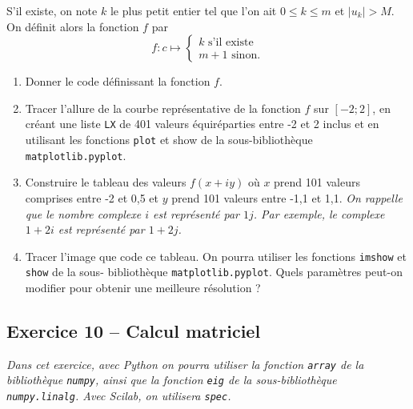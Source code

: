 \documentclass[10pt,fleqn]{article} %
\begin{document}
\begin{multicols}{2}
S’il existe, on note $k$ le plus petit entier tel que l’on ait $0 \leq k \leq m$ et $|u_k| > M$.
On définit alors la fonction $f$ par 
$$
f : c \mapsto 
\left\{
\begin{array}{l}
k \text{ s'il existe} \\
m+1  \text{ sinon.}
\end{array}
\right.
$$

\begin{enumerate}
\item  Donner le code définissant la fonction $f$.
\item  Tracer l’allure de la courbe représentative de la fonction $f$ sur $[-2; 2]$, en créant une liste \texttt{LX} de 401 valeurs équiréparties entre -2 et 2 inclus et en utilisant les fonctions \texttt{plot} et show de la sous-bibliothèque \texttt{matplotlib.pyplot}.
\item  Construire le tableau des valeurs $f(x+i y)$ où $x$ prend 101 valeurs comprises entre -2 et 0,5 et $y$ prend
101 valeurs entre -1,1 et 1,1. \textit{On rappelle que le nombre complexe $i$ est représenté par $1j$. Par exemple,
le complexe $1 + 2 i$ est représenté par $1+2j$.}
\item  Tracer l’image que code ce tableau. On pourra utiliser les fonctions \texttt{imshow} et \texttt{show} de la sous-
bibliothèque \texttt{matplotlib.pyplot}. Quels paramètres peut-on modifier pour obtenir une meilleure résolution ?
\end{enumerate}


\subsection*{Exercice 10 -- Calcul matriciel}
\textit{Dans cet exercice, avec Python on pourra utiliser la fonction \texttt{array} de la bibliothèque \texttt{numpy}, ainsi que la
fonction \texttt{eig} de la sous-bibliothèque \texttt{numpy.linalg}. Avec Scilab, on utilisera \texttt{spec}.}


\end{multicols}
\end{document}
